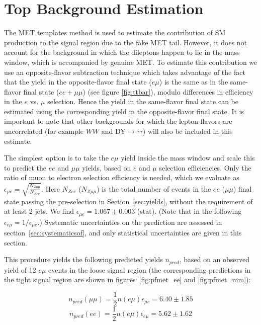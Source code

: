 


\section{Top Background Estimation}
\label{sec:topbkg}


The MET templates method is used to estimate the contribution of SM \Z production
 to the signal region due to the fake MET tail. However,
it does not account for the \ttbar background in which the dileptons happen to lie
 in the \Z mass window, which is accompanied by genuine MET. 
To estimate this contribution we use an opposite-flavor subtraction
technique which takes advantage of the fact that the \ttbar yield in the 
opposite-flavor final state ($e\mu$) is the same as in the same-flavor final state
($ee+\mu\mu$) (see figure \ref{fig:ttbar}), 
modulo differences in efficiency in the $e$ vs. $\mu$ selection.
 Hence the \ttbar yield in the same-flavor final state can be estimated
using the corresponding yield in the opposite-flavor final state. 
It is important to note that other backgrounds for which the lepton flavors are
uncorrelated (for example $WW$ and DY$\rightarrow \tau\tau$) will also be included in
this estimate.

The simplest option
 is to take the $e\mu$ yield inside the \Z mass window and scale this
to predict the $ee$ and $\mu\mu$ yields, based on $e$ and $\mu$ selection efficiencies.
Only the ratio of muon to electron selection efficiency is needed, which we evaluate
 as $\epsilon_{\mu e} = \sqrt{\frac{N_{Z\mu\mu}}{N_{Zee}}}$. 
Here $N_{Zee}$ ($N_{Z\mu\mu}$) is the total number of events in the $ee$ ($\mu\mu$)
 final state passing the pre-selection in Section~\ref{sec:yields},
without the requirement of at least 2 jets. We find
 $\epsilon_{\mu e}=1.067 \pm 0.003$ (stat). %
(Note that in the following $\epsilon_{e\mu} = 1/\epsilon_{\mu e}$.)
Systematic uncertainties on the prediction are assessed in section~\ref{sec:systematicsof}, 
and only statistical uncertainties are given in this section.

This procedure yields the following predicted yields $n_{pred}$,
based on an observed yield of 12 $e\mu$ events %
in the loose signal region (the corresponding predictions in the tight 
signal region are shown in figures~\ref{fig:pfmet_ee} and \ref{fig:pfmet_mm}): 

\begin{equation}
n_{pred}(\mu\mu) = \frac{1}{2}n(e\mu)\epsilon_{\mu e} = 6.40 \pm 1.85 %
\end{equation}
\begin{equation}
n_{pred}(ee)     = \frac{1}{2}n(e\mu)\epsilon_{e\mu} = 5.62 \pm 1.62
\end{equation}

